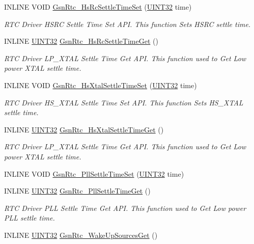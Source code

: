 \begin{DoxyCompactItemize}
INLINE VOID \hyperlink{a00651_ga1357f8d86bead303212bbbb6b8eb2e93}{GsnRtc\_\-HsRcSettleTimeSet} (\hyperlink{a00660_gae1e6edbbc26d6fbc71a90190d0266018}{UINT32} time)
\begin{DoxyCompactList}\small\item\em RTC Driver HSRC Settle Time Set API. This function Sets HSRC settle time. \end{DoxyCompactList}\item 
INLINE \hyperlink{a00660_gae1e6edbbc26d6fbc71a90190d0266018}{UINT32} \hyperlink{a00651_gaf435dc6510168b10df7f98b5a9729ff3}{GsnRtc\_\-HsRcSettleTimeGet} ()
\begin{DoxyCompactList}\small\item\em RTC Driver LP\_\-XTAL Settle Time Get API. This function used to Get Low power XTAL settle time. \end{DoxyCompactList}\item 
INLINE VOID \hyperlink{a00651_ga6f74fe904609b816930c14d107ebf828}{GsnRtc\_\-HsXtalSettleTimeSet} (\hyperlink{a00660_gae1e6edbbc26d6fbc71a90190d0266018}{UINT32} time)
\begin{DoxyCompactList}\small\item\em RTC Driver HS\_\-XTAL Settle Time Set API. This function Sets HS\_\-XTAL settle time. \end{DoxyCompactList}\item 
INLINE \hyperlink{a00660_gae1e6edbbc26d6fbc71a90190d0266018}{UINT32} \hyperlink{a00651_gac8e4d362029658a699c14fa3ceec4802}{GsnRtc\_\-HsXtalSettleTimeGet} ()
\begin{DoxyCompactList}\small\item\em RTC Driver LP\_\-XTAL Settle Time Get API. This function used to Get Low power XTAL settle time. \end{DoxyCompactList}\item 
INLINE VOID \hyperlink{a00582_a57bfca25bd97d3ed9c50f91db2ab3a9e}{GsnRtc\_\-PllSettleTimeSet} (\hyperlink{a00660_gae1e6edbbc26d6fbc71a90190d0266018}{UINT32} time)
\item 
INLINE \hyperlink{a00660_gae1e6edbbc26d6fbc71a90190d0266018}{UINT32} \hyperlink{a00651_ga76272338daff01b78ecb5c4e92ff6bb8}{GsnRtc\_\-PllSettleTimeGet} ()
\begin{DoxyCompactList}\small\item\em RTC Driver PLL Settle Time Get API. This function used to Get Low power PLL settle time. \end{DoxyCompactList}\item 
INLINE \hyperlink{a00660_gae1e6edbbc26d6fbc71a90190d0266018}{UINT32} \hyperlink{a00651_ga46bf97151e65ad7c2eff132d8f158ac7}{GsnRtc\_\-WakeUpSourcesGet} ()

\end{DoxyCompactItemize}
